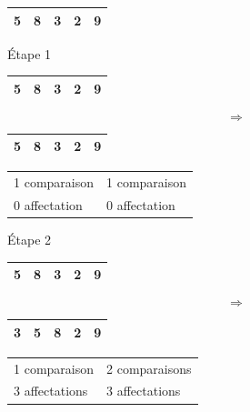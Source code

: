 \documentclass[10pt,fleqn]{article} %
\begin{document}
\begin{tabular}{|c|c|c|c|c|}
\hline
5 & 8 & 3 & 2 & 9 \\
\hline
\end{tabular}

\begin{minipage}[b]{.07\linewidth}
Étape 1 
\end{minipage}\hfill
\begin{minipage}[b]{.15\linewidth}
\begin{tabular}{|c|c|c|c|c|}
\hline
\cellcolor{black!10}5 & \cellcolor{black!30}8 & 3 & 2 & 9 \\
\hline
\end{tabular}
\end{minipage}\hfill
\begin{minipage}[b]{.05\linewidth}
$$
\Longrightarrow
$$
\end{minipage}\hfill
\begin{minipage}[b]{.15\linewidth}
\begin{tabular}{|c|c|c|c|c|}
\hline
\cellcolor{black!10}5 & \cellcolor{black!30}8 & 3 & 2 & 9 \\
\hline
\end{tabular}
\end{minipage}\hfill
\begin{minipage}[b]{.3\linewidth}
\begin{tabular}{ll}
1 comparaison & 1 comparaison \\
0 affectation & 0 affectation \\
\end{tabular}
\end{minipage}


\begin{minipage}[b]{.07\linewidth}
Étape 2
\end{minipage}\hfill
\begin{minipage}[b]{.15\linewidth}
\begin{tabular}{|c|c|c|c|c|}
\hline
\cellcolor{black!10}5 & \cellcolor{black!10}8 & \cellcolor{black!30}3 & 2 & 9 \\
\hline
\end{tabular}
\end{minipage}\hfill
\begin{minipage}[b]{.05\linewidth}
$$
\Longrightarrow
$$
\end{minipage}\hfill
\begin{minipage}[b]{.15\linewidth}
\begin{tabular}{|c|c|c|c|c|}
\hline
\cellcolor{black!30} 3 & \cellcolor{black!10}5 & \cellcolor{black!10}8 & 2 & 9 \\
\hline
\end{tabular}
\end{minipage}\hfill
\begin{minipage}[b]{.3\linewidth}
\begin{tabular}{ll}
1 comparaison & 2 comparaisons \\
3 affectations & 3 affectations \\
\end{tabular}
\end{minipage}
\end{document}
